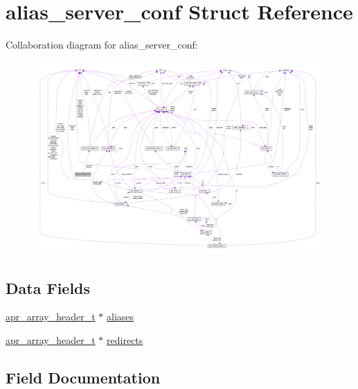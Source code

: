 \hypertarget{structalias__server__conf}{}\section{alias\+\_\+server\+\_\+conf Struct Reference}
\label{structalias__server__conf}


Collaboration diagram for alias\+\_\+server\+\_\+conf\+:
\nopagebreak
\begin{figure}[H]
\begin{center}
\leavevmode
\includegraphics[width=350pt]{structalias__server__conf__coll__graph}
\end{center}
\end{figure}
\subsection*{Data Fields}
\begin{DoxyCompactItemize}
\item 
\hyperlink{structapr__array__header__t}{apr\+\_\+array\+\_\+header\+\_\+t} $\ast$ \hyperlink{structalias__server__conf_a49abd1550343e0ebdb42f7524e209262}{aliases}
\item 
\hyperlink{structapr__array__header__t}{apr\+\_\+array\+\_\+header\+\_\+t} $\ast$ \hyperlink{structalias__server__conf_a2bc2ef79d9f39c3abc8f7ad797cafb48}{redirects}
\end{DoxyCompactItemize}


\subsection{Field Documentation}
